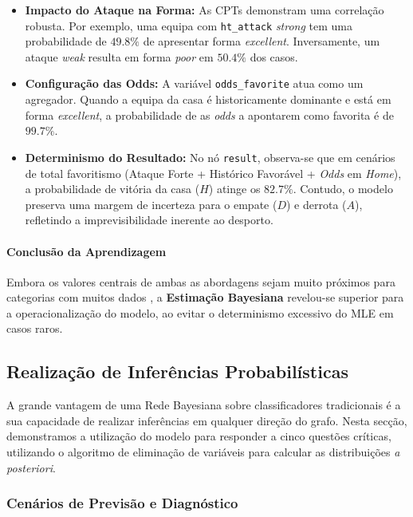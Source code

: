 \documentclass[10pt]{article}
\begin{document}
\begin{itemize}
    \item \textbf{Impacto do Ataque na Forma:} As CPTs demonstram uma correlação robusta. Por exemplo, uma equipa com \texttt{ht\_attack} \textit{strong} tem uma probabilidade de $49.8\%$ de apresentar forma \textit{excellent}. Inversamente, um ataque \textit{weak} resulta em forma \textit{poor} em $50.4\%$ dos casos.
    \item \textbf{Configuração das Odds:} A variável \texttt{odds\_favorite} atua como um agregador. Quando a equipa da casa é historicamente dominante e está em forma \textit{excellent}, a probabilidade de as \textit{odds} a apontarem como favorita é de $99.7\%$.
    \item \textbf{Determinismo do Resultado:} No nó \texttt{result}, observa-se que em cenários de total favoritismo (Ataque Forte + Histórico Favorável + \textit{Odds} em \textit{Home}), a probabilidade de vitória da casa ($H$) atinge os $82.7\%$. Contudo, o modelo preserva uma margem de incerteza para o empate ($D$) e derrota ($A$), refletindo a imprevisibilidade inerente ao desporto.
\end{itemize}

\paragraph{Conclusão da Aprendizagem}
Embora os valores centrais de ambas as abordagens sejam muito próximos para categorias com muitos dados , a \textbf{Estimação Bayesiana} revelou-se superior para a operacionalização do modelo, ao evitar o determinismo excessivo do MLE em casos raros.

\subsection{Realização de Inferências Probabilísticas}

A grande vantagem de uma Rede Bayesiana sobre classificadores tradicionais é a sua capacidade de realizar inferências em qualquer direção do grafo. Nesta secção, demonstramos a utilização do modelo para responder a cinco questões críticas, utilizando o algoritmo de eliminação de variáveis para calcular as distribuições \textit{a posteriori}.

\subsubsection{Cenários de Previsão e Diagnóstico}
\end{document}
